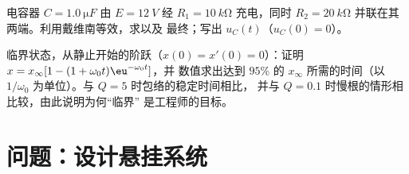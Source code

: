 \begin{exercise}[$\star\star\star$]\label{exo:b1:transient-regimes:11}
电容器 $C = \qty{1.0}{\micro F}$ 由 $E = \qty{12}{V}$ 经
$R_1 = \qty{10}{k\ohm}$ 充电，同时 $R_2 = \qty{20}{k\ohm}$
并联在其两端。利用戴维南等效，求以及
最终；写出 $u_C(t)$（$u_C(0) = 0$）。
\end{exercise}

\begin{exercise}[$\star\star\star$]\label{exo:b1:transient-regimes:12}
临界状态，从静止开始的阶跃（$x(0) = x'(0) = 0$）：证明
$x = x_\infty[1 - (1 + \omega_0 t)\eu^{-\omega_0 t}]$，并
数值求出达到 $95\%$ 的 $x_\infty$ 所需的时间（以
$1/\omega_0$ 为单位）。与 $Q = 5$ 时包络的稳定时间相比，
并与 $Q = 0.1$ 时慢根的情形相比较，由此说明为何“临界”
是工程师的目标。
\end{exercise}

\section{问题：设计悬挂系统}

